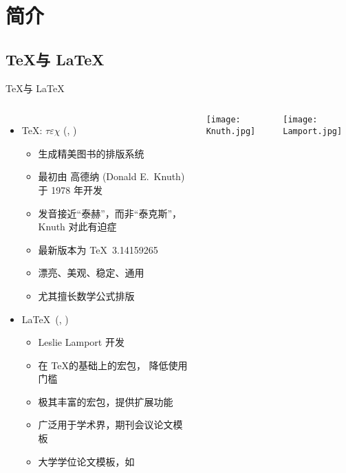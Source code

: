 \section{简介}

\subsection{\TeX 与 \LaTeX}

\begin{frame}[fragile]{\TeX 与 \LaTeX}
  \begin{columns}[T]
    \begin{itemize}
      \item \TeX: $\tau\varepsilon\chi$ (,
        )
        \begin{itemize}
          \item 生成精美图书的排版系统
          \item 最初由 高德纳 (Donald E.~Knuth) 于 1978 年开发
          \item 发音接近``泰赫''，而非``泰克斯''，
            Knuth 对此有迫症
          \item 最新版本为 \TeX\ 3.14159265 
          \item 漂亮、美观、稳定、通用
          \item 尤其擅长数学公式排版
        \end{itemize}
      \item \LaTeX\ (, )
        \begin{itemize}
          \item Leslie Lamport 开发 
          \item 在 \TeX 的基础上的宏包， 降低使用门槛
          \item 极其丰富的宏包，提供扩展功能
          \item 广泛用于学术界，期刊会议论文模板
          \item 大学学位论文模板，如 \ThuThesis
        \end{itemize}
    \end{itemize}
    \vspace*{5mm}
    \texttt{[image: Knuth.jpg]}

    \vspace*{5mm}
    \texttt{[image: Lamport.jpg]}
      
  \end{columns}
\end{frame}

